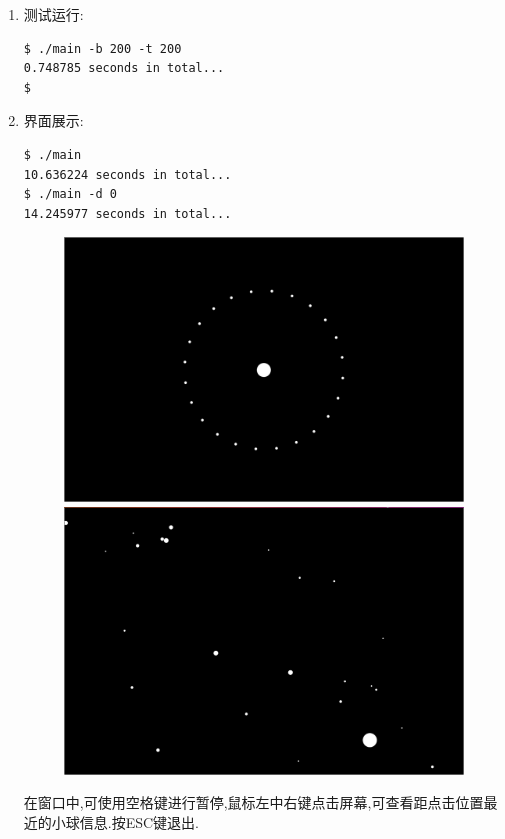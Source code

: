 \begin{enumerate}
\item 测试运行:
\begin{lstlisting}
$ ./main -b 200 -t 200
0.748785 seconds in total...
$
\end{lstlisting}

\item 界面展示:
\begin{lstlisting}
$ ./main
10.636224 seconds in total...
$ ./main -d 0
14.245977 seconds in total...
\end{lstlisting}

\begin{figure}[H]
	\centering
	\includegraphics[scale=0.4]{res/screen.png}
	\includegraphics[scale=0.4]{res/screen2.png}
\end{figure}


在窗口中,可使用空格键进行暂停,鼠标左中右键点击屏幕,可查看距点击位置最近的小球信息.按ESC键退出.

\end{enumerate}
